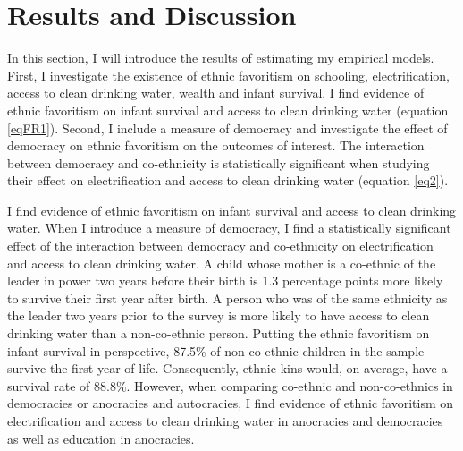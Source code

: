 \documentclass{wptemp}
\begin{document}
\section{Results and Discussion}\label{sec5}

In this section, I will introduce the results of estimating my empirical models. First, I investigate the existence of ethnic favoritism on schooling, electrification, access to clean drinking water, wealth and infant survival. I find evidence of ethnic favoritism on infant survival and access to clean drinking water (equation \ref{eqFR1}). Second, I include a measure of democracy and investigate the effect of democracy on ethnic favoritism on the outcomes of interest. The interaction between democracy and co-ethnicity is statistically significant when studying their effect on electrification and access to clean drinking water (equation \ref{eq2}).

I find evidence of ethnic favoritism on infant survival and access to clean drinking water. When I introduce a measure of democracy, I find a statistically significant effect of the interaction between democracy and co-ethnicity on electrification and access to clean drinking water. A child whose mother is a co-ethnic of the leader in power two years before their birth is 1.3 percentage points more likely to survive their first year after birth.  A person who was of the same ethnicity as the leader two years prior to the survey is more likely to have access to clean drinking water than a non-co-ethnic person. Putting the ethnic favoritism on infant survival in perspective, 87.5\% of non-co-ethnic children in the sample survive the first year of life. Consequently, ethnic kins would, on average, have a survival rate of 88.8\%. However, when comparing co-ethnic and non-co-ethnics in democracies or anocracies and autocracies, I find evidence of ethnic favoritism on electrification and access to clean drinking water in anocracies and democracies as well as education in anocracies.
\end{document}
